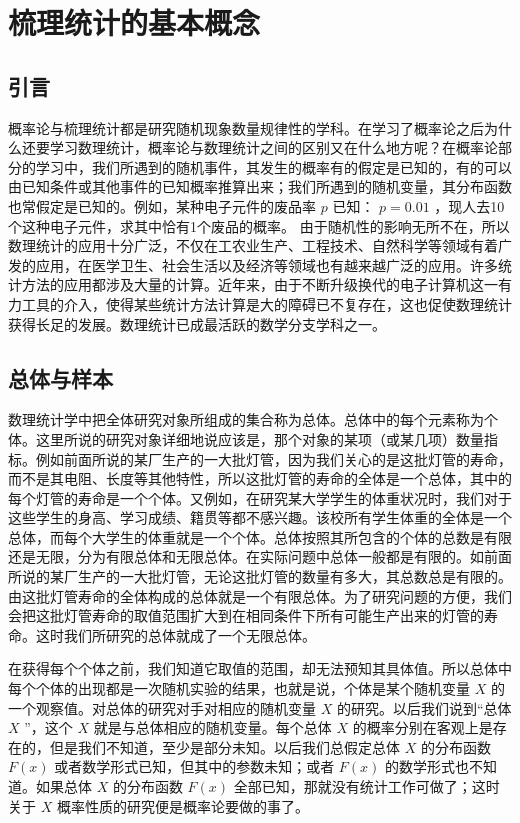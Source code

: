 \chapter{梳理统计的基本概念}
\section{引言}
概率论与梳理统计都是研究随机现象数量规律性的学科。在学习了概率论之后为什么还要学习数理统计，概率论与数理统计之间的区别又在什么地方呢？在概率论部分的学习中，我们所遇到的随机事件，其发生的概率有的假定是已知的，有的可以由已知条件或其他事件的已知概率推算出来；我们所遇到的随机变量，其分布函数也常假定是已知的。例如，某种电子元件的废品率
$p$
已知：
$p=0.01$
，现人去10个这种电子元件，求其中恰有1个废品的概率。
由于随机性的影响无所不在，所以数理统计的应用十分广泛，不仅在工农业生产、工程技术、自然科学等领域有着广发的应用，在医学卫生、社会生活以及经济等领域也有越来越广泛的应用。许多统计方法的应用都涉及大量的计算。近年来，由于不断升级换代的电子计算机这一有力工具的介入，使得某些统计方法计算是大的障碍已不复存在，这也促使数理统计获得长足的发展。数理统计已成最活跃的数学分支学科之一。

\section{总体与样本} 

数理统计学中把全体研究对象所组成的集合称为总体。总体中的每个元素称为个体。这里所说的研究对象详细地说应该是，那个对象的某项（或某几项）数量指标。例如前面所说的某厂生产的一大批灯管，因为我们关心的是这批灯管的寿命，而不是其电阻、长度等其他特性，所以这批灯管的寿命的全体是一个总体，其中的每个灯管的寿命是一个个体。又例如，在研究某大学学生的体重状况时，我们对于这些学生的身高、学习成绩、籍贯等都不感兴趣。该校所有学生体重的全体是一个总体，而每个大学生的体重就是一个个体。总体按照其所包含的个体的总数是有限还是无限，分为有限总体和无限总体。在实际问题中总体一般都是有限的。如前面所说的某厂生产的一大批灯管，无论这批灯管的数量有多大，其总数总是有限的。由这批灯管寿命的全体构成的总体就是一个有限总体。为了研究问题的方便，我们会把这批灯管寿命的取值范围扩大到在相同条件下所有可能生产出来的灯管的寿命。这时我们所研究的总体就成了一个无限总体。

在获得每个个体之前，我们知道它取值的范围，却无法预知其具体值。所以总体中每个个体的出现都是一次随机实验的结果，也就是说，个体是某个随机变量
$X$
的一个观察值。对总体的研究对手对相应的随机变量
$X$
的研究。以后我们说到“总体
$X$
”，这个
$X$
就是与总体相应的随机变量。每个总体
$X$
的概率分别在客观上是存在的，但是我们不知道，至少是部分未知。以后我们总假定总体
$X$
的分布函数
$F(x)$
或者数学形式已知，但其中的参数未知；或者
$F(x)$
的数学形式也不知道。如果总体
$X$
的分布函数
$F(x)$
全部已知，那就没有统计工作可做了；这时关于
$X$
概率性质的研究便是概率论要做的事了。

